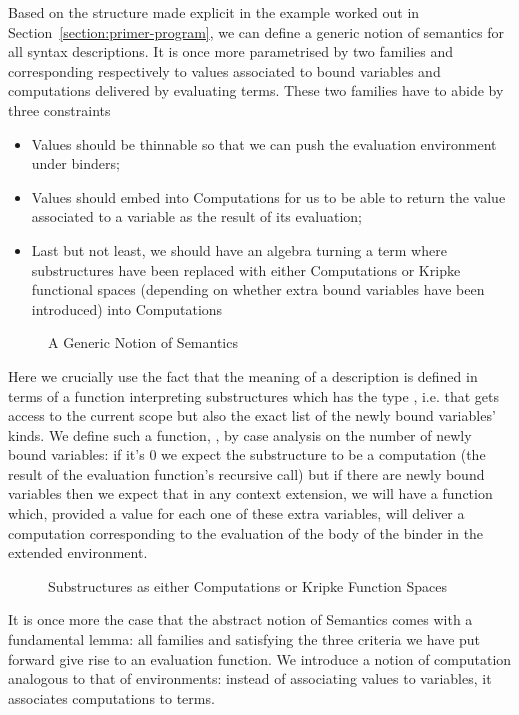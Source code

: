 Based on the structure made explicit in the example worked out
in Section~\ref{section:primer-program}, we can define a generic notion of
semantics for all syntax descriptions. It is once more parametrised
by two  families  and  corresponding
respectively to values associated to bound variables and
computations delivered by evaluating terms. These two families
have to abide by three constraints
\begin{itemize}
\item Values should be thinnable so that we can push the
      evaluation environment under binders;
\item Values should embed into Computations for us to be able
      to return the value associated to a variable as the
      result of its evaluation;
\item Last but not least, we should have an algebra turning
      a term where substructures have been replaced with
      either Computations or Kripke functional spaces (depending
      on whether extra bound variables have been introduced)
      into Computations
\end{itemize}

\begin{figure}[h]
\caption{A Generic Notion of Semantics}
\end{figure}

Here we crucially use the fact that the meaning of a description is
defined in terms of a function interpreting substructures which has
the type    , i.e. that gets access
to the current scope but also the exact list of the newly bound variables' kinds.
We define such a function, , by case analysis on the number
of newly bound variables: if it's $0$ we expect the substructure
to be a computation (the result of the evaluation function's
recursive call) but if there are newly bound variables then we expect
that in any context extension, we will have a function which, provided
a value for each one of these extra variables, will deliver a computation
corresponding to the evaluation of the body of the binder in the extended
environment.

\begin{figure}[h]
\caption{Substructures as either Computations or Kripke Function Spaces}
\end{figure}

It is once more the case that the abstract notion of Semantics comes
with a fundamental lemma: all   families  and
 satisfying the three criteria we have put forward give rise
to an evaluation function. We introduce a notion of computation
 analogous to that of environments: instead of associating
values to variables, it associates computations to terms.

